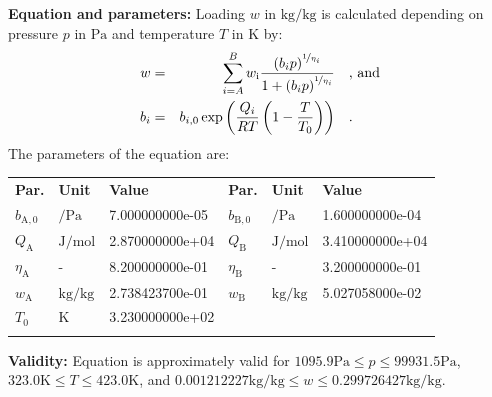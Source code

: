 \textbf{Equation and parameters:}
\newline
%
Loading $w$ in $\si{\kilogram\per\kilogram}$ is calculated depending on pressure $p$ in $\si{\pascal}$ and temperature $T$ in $\si{\kelvin}$ by:
%
\begin{equation*}
\begin{split}
w &=& \sum_{i=A}^{B} w_\mathrm{i} \frac{\left( b_i p \right) ^ {\nicefrac{1}{\eta_i}} }{1 + \left( b_i p \right) ^ {\nicefrac{1}{\eta_i}}} & \quad\text{, and} \\
b_i &=& b_{i,0} \exp \left( \frac{Q_i}{R T} \left( 1 - \frac{T}{T_0} \right) \right) & \quad\text{.}
\end{split}
\end{equation*}
%
The parameters of the equation are:
%
\begin{longtable}[l]{lll|lll}
\toprule
\addlinespace
\textbf{Par.} & \textbf{Unit} & \textbf{Value} &	\textbf{Par.} & \textbf{Unit} & \textbf{Value} \\
\addlinespace
\midrule
\endhead

\bottomrule
\endfoot
\bottomrule
\endlastfoot
\addlinespace

$b_\mathrm{A,0}$ & $\si{\per\pascal}$ & 7.000000000e-05 & $b_\mathrm{B,0}$ & $\si{\per\pascal}$ & 1.600000000e-04 \\
$Q_\mathrm{A}$ & $\si{\joule\per\mole}$ & 2.870000000e+04 & $Q_\mathrm{B}$ & $\si{\joule\per\mole}$ & 3.410000000e+04 \\
$\eta_\mathrm{A}$ & - & 8.200000000e-01 & $\eta_\mathrm{B}$ & - & 3.200000000e-01 \\
$w_\mathrm{A}$ & $\si{\kilogram\per\kilogram}$ & 2.738423700e-01 & $w_\mathrm{B}$ & $\si{\kilogram\per\kilogram}$ & 5.027058000e-02 \\
$T_0$ & $\si{\kelvin}$ & 3.230000000e+02 & & & \\

\addlinespace\end{longtable}

\textbf{Validity:}
\newline
Equation is approximately valid for $1095.9 \si{\pascal} \leq p \leq 99931.5 \si{\pascal}$,  $323.0 \si{\kelvin} \leq T \leq 423.0 \si{\kelvin}$, and $0.001212227 \si{\kilogram\per\kilogram} \leq w \leq 0.299726427 \si{\kilogram\per\kilogram}$.
\newline

